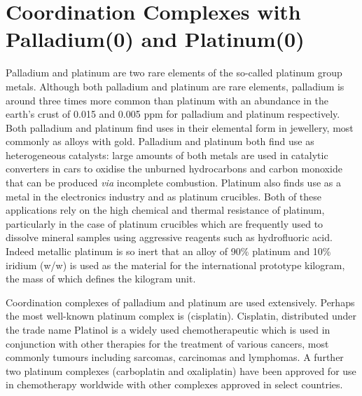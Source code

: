 
\chapter{Coordination Complexes with Palladium(0) and Platinum(0)}
\label{ch:platinum0}

Palladium and platinum are two rare elements of the so-called platinum group metals.  Although both palladium and platinum are rare elements, palladium is around three times more common than platinum with an abundance in the earth's crust of 0.015 and 0.005 ppm for palladium and platinum respectively.  Both palladium and platinum find uses in their elemental form in jewellery, most commonly as alloys with gold.  Palladium and platinum both find use as heterogeneous catalysts: large amounts of both metals are used in catalytic converters in cars to oxidise the unburned hydrocarbons and carbon monoxide that can be produced \emph{via} incomplete combustion.  Platinum also finds use as a metal in the electronics industry and as platinum crucibles.  Both of these applications rely on the high chemical and thermal resistance of platinum, particularly in the case of platinum crucibles which are frequently used to dissolve mineral samples using aggressive reagents such as hydrofluoric acid.  Indeed metallic platinum is so inert that an alloy of 90\%{} platinum and 10\%{} iridium (w/w) is used as the material for the international prototype kilogram, the mass of which defines the kilogram unit.  


Coordination complexes of palladium and platinum are used extensively.  Perhaps the most well-known platinum complex is \ce{[Pt(NH3)2Cl2]} (cisplatin).  Cisplatin, distributed under the trade name Platinol is a widely used chemotherapeutic which is used in conjunction with other therapies for the treatment of various cancers, most commonly tumours including sarcomas, carcinomas and lymphomas.\cite{Rosenberg1969, Wilson2013}  A further two platinum complexes (carboplatin and oxaliplatin) have been approved for use in chemotherapy worldwide with other complexes approved in select countries.\cite{Pasqua2007, Wilson2013}


